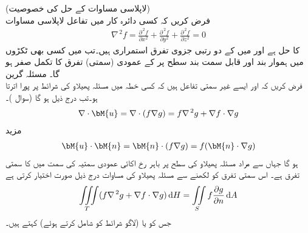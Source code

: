 \quad (لاپلاسی مساوات کے حل کی خصوصیت)\\
فرض کریں کہ کسی دائرہ کار  میں تفاعل  لاپلاسی مساوات
\begin{align*}
\nabla^{\,2}f=\frac{\partial^{\,2} f}{\partial x^2}+\frac{\partial^{\,2} f}{\partial y^2}+\frac{\partial^{\,2} f}{\partial z^2}=0
\end{align*}
کا حل ہے اور  میں  کے دو رتبی جزوی تفرق استمراری ہیں۔تب  میں کسی بھی ٹکڑوں میں ہموار  بند اور قابل سمت بند سطح  پر  کے عمودی  (سمتی) تفرق کا تکمل صفر ہو گا۔
\quad مسئلہ گرین\\
فرض کریں کہ  اور  ایسے غیر سمتی تفاعل ہیں کہ کسی خطہ  میں  مسئلہ پھیلاو کی شرائط پر پورا اترتا ہو۔تب درج ذیل ہو گا (سوال )۔
\begin{align*}
\nabla \cdot \bM{u}=\nabla \cdot(f\nabla g)=f\nabla^{\,2}g+\nabla f \cdot \nabla g
\end{align*}
مزید
\begin{align*}
\bM{u}\cdot \bM{n}=\bM{n}\cdot(f\nabla g)=f(\bM{n}\cdot \nabla g)
\end{align*}
ہو گا جہاں  سے مراد مسئلہ پھیلاو کی سطح  پر باہر رخ اکائی عمودی سمتیہ  کی سمت میں  کا سمتی تفرق ہے۔ اس سمتی تفرق کو  لکھنے سے مسئلہ پھیلاو کی مساوات درج ذیل صورت اختیار کرتی ہے
\begin{align}\label{مساوات_خطی_تکمل_گرین_کلیہ_اول}
\iiint\limits_T (f\nabla^{\,2}g+\nabla f\cdot \nabla g)\dif H=\iint\limits_S f\frac{\partial g}{\partial n}\dif A
\end{align}
جس کو   یا (لاگو شرائط کو شامل کرتے ہوئے)  کہتے ہیں۔

